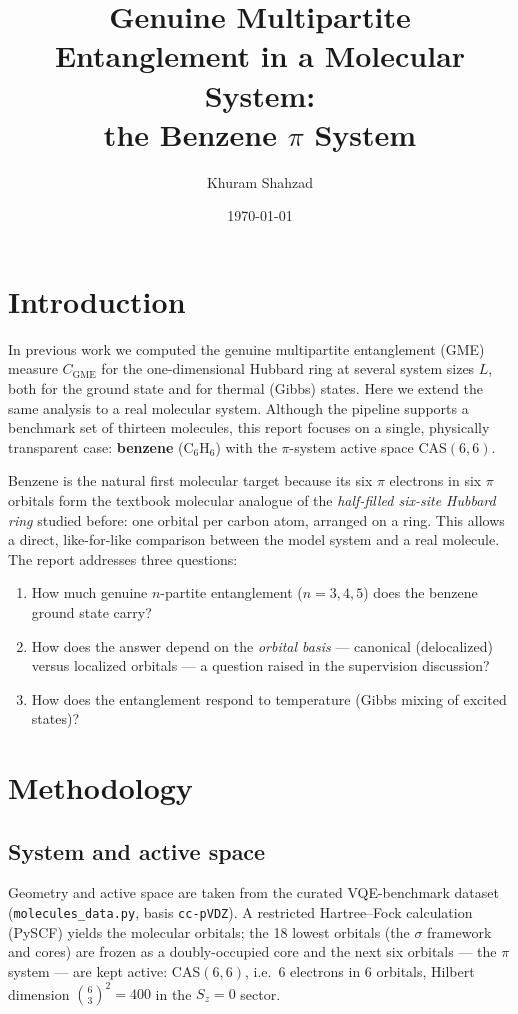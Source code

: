 \documentclass[11pt]{article}
\title{\textbf{Genuine Multipartite Entanglement in a Molecular System:\\
       the Benzene $\pi$ System}}
\author{Khuram Shahzad}
\date{\today}
\newcommand{\code}[1]{\texttt{\small #1}}
\newcommand{\CGME}{\ensuremath{C_{\mathrm{GME}}}}
\begin{document}
\maketitle
\tableofcontents
\bigskip

\section{Introduction}
In previous work we computed the genuine multipartite entanglement (GME)
measure \CGME{} for the one-dimensional Hubbard ring at several system sizes
$L$, both for the ground state and for thermal (Gibbs) states. Here we extend
the same analysis to a real molecular system. Although the pipeline supports a
benchmark set of thirteen molecules, this report focuses on a single, physically
transparent case: \textbf{benzene} (C$_6$H$_6$) with the $\pi$-system active
space CAS$(6,6)$.

Benzene is the natural first molecular target because its six $\pi$ electrons
in six $\pi$ orbitals form the textbook molecular analogue of the
\emph{half-filled six-site Hubbard ring} studied before: one orbital per carbon
atom, arranged on a ring. This allows a direct, like-for-like comparison
between the model system and a real molecule. The report addresses three
questions:
\begin{enumerate}[nosep]
  \item How much genuine $n$-partite entanglement ($n=3,4,5$) does the benzene
        ground state carry?
  \item How does the answer depend on the \emph{orbital basis} --- canonical
        (delocalized) versus localized orbitals --- a question raised in the
        supervision discussion?
  \item How does the entanglement respond to temperature (Gibbs mixing of
        excited states)?
\end{enumerate}

\section{Methodology}\label{sec:method}

\subsection{System and active space}
Geometry and active space are taken from the curated VQE-benchmark dataset
(\code{molecules\_data.py}, basis \code{cc-pVDZ}). A restricted Hartree--Fock
calculation (PySCF) yields the molecular orbitals; the 18 lowest orbitals
(the $\sigma$ framework and cores) are frozen as a doubly-occupied core and the
next six orbitals --- the $\pi$ system --- are kept active:
CAS$(6,6)$, i.e.\ 6 electrons in 6 orbitals, Hilbert dimension
$\binom{6}{3}^2=400$ in the $S_z=0$ sector.
\end{document}

